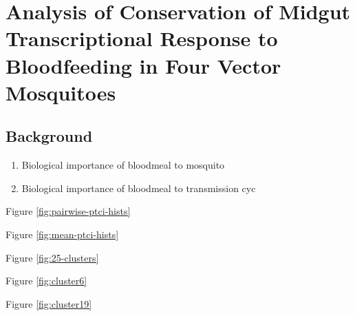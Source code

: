 \chapter{Analysis of Conservation of Midgut Transcriptional Response to Bloodfeeding in Four Vector Mosquitoes}



\section{Background}
\begin{enumerate}
 \item Biological importance of bloodmeal to mosquito
 \item Biological importance of bloodmeal to transmission cyc
\end{enumerate}



Figure \ref{fig:pairwise-ptci-hists}


Figure \ref{fig:mean-ptci-hists}



Figure \ref{fig:25-clusters}


Figure \ref{fig:cluster6}


Figure \ref{fig:cluster19}



